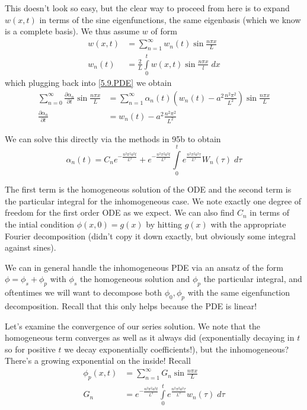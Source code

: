 \documentclass[10pt]{report}
\newcommand{\pd}[2]{\frac{\partial #1}{\partial#2}}
\begin{document}
This doesn't look so easy, but the clear way to proceed from here is to expand $w(x,t)$ in terms of the sine eigenfunctions, the same eigenbasis (which we know is a complete basis). We thus assume $w$ of form
\begin{align}
    w(x,t) &= \sum_{n=1}^{\infty}w_n(t)\sin \frac{n\pi x}{L}\\
    w_n(t) &= \frac{2}{L}\int\limits_{0}^{t}w(x,t) \sin \frac{n\pi x}{l}\;dx
\end{align}
which plugging back into \eqref{5.9.PDE} we obtain
\begin{align}
    \sum_{n=0}^{\infty}\pd{\alpha_n}{t}\sin \frac{n\pi x}{L} &= \sum_{n=1}^{\infty}\alpha_n(t) \left( w_n(t) - a^2 \frac{n^2\pi^2}{L^2} \right)\sin \frac{n\pi x}{L}\\
    \pd{\alpha_n}{t} &= w_n(t) - a^2\frac{n^2 \pi^2}{L^2}
\end{align}

We can solve this directly via the methods in 95b to obtain
\begin{equation}
    \alpha_n(t) = C_n e^{-\frac{n^2 \pi^2 a^2 t}{L^2}} + e^{-\frac{n^2 \pi^2 a^2 t}{L^2}}\int\limits_{0}^{t}e^{\frac{n^2 \pi^2 a^2 \tau}{L^2}}W_n(\tau)\;d\tau
\end{equation}

The first term is the homogeneous solution of the ODE and the second term is the particular integral for the inhomogeneous case. We note exactly one degree of freedom for the first order ODE as we expect. We can also find $C_n$ in terms of the intial condition $\phi(x,0) = g(x)$ by hitting $g(x)$ with the appropriate Fourier decomposition (didn't copy it down exactly, but obviously some integral against sines).

We can in general handle the inhomogeneous PDE via an ansatz of the form $\phi = \phi_{s} + \phi_{p}$ with $\phi_s$ the homogeneous solution and $\phi_p$ the particular integral, and oftentimes we will want to decompose both $\phi_0, \phi_p$ with the same eigenfunction decomposition. Recall that this only helps because the PDE is linear!

Let's examine the convergence of our series solution. We note that the homogeneous term converges as well as it always did (exponentially decaying in $t$ so for positive $t$ we decay exponentially coefficients!), but the inhomogeneous? There's a growing exponential on the inside! Recall
\begin{align}
    \phi_p(x,t) &= \sum_{n=1}^{\infty}G_n\sin \frac{n\pi x}{L}\\
    G_n &= e^{-\frac{n^2 \pi^2 a^2 t}{L^2}}\int\limits_{0}^{t}e^{\frac{n^2 \pi^2 a^2 \tau}{L^2}}w_n(\tau)\;d\tau\label{5.9.inhom}
\end{align}
\end{document}
